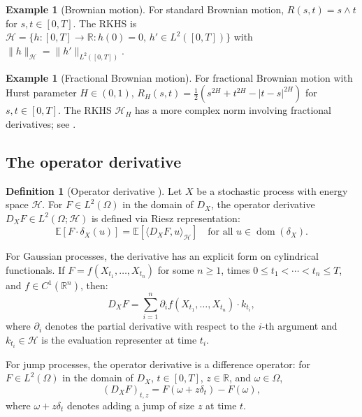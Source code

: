 \documentclass[12pt]{article}
\theoremstyle{plain}
\theoremstyle{definition}
\newtheorem{definition}[theorem]{Definition}
\newtheorem{example}[theorem]{Example}
\theoremstyle{remark}
\newcommand{\E}{\mathbb{E}}
\newcommand{\R}{\mathbb{R}}
\newcommand{\HH}{\mathcal{H}}
\newcommand{\dom}{\operatorname{dom}}
\begin{document}
\begin{example}[Brownian motion]\label{ex:BM-RKHS}
For standard Brownian motion, $R(s,t) = s \wedge t$ for $s, t \in [0,T]$. The RKHS is $\HH = \{h: [0,T] \to \R : h(0) = 0, \, h' \in L^2([0,T])\}$ with $\|h\|_{\HH} = \|h'\|_{L^2([0,T])}$.
\end{example}

\begin{example}[Fractional Brownian motion]\label{ex:fBM-RKHS}
For fractional Brownian motion with Hurst parameter $H \in (0,1)$, $R_H(s,t) = \frac{1}{2}(s^{2H} + t^{2H} - |t-s|^{2H})$ for $s, t \in [0,T]$. The RKHS $\HH_H$ has a more complex norm involving fractional derivatives; see \cite{PipirasTaqqu2017, DecrUstunel1999}.
\end{example}

\subsection{The operator derivative}

\begin{definition}[Operator derivative {\cite{Fontes2026d}}]\label{def:operator-derivative}
Let $X$ be a stochastic process with energy space $\HH$. For $F \in L^2(\Omega)$ in the domain of $D_X$, the operator derivative $D_X F \in L^2(\Omega; \HH)$ is defined via Riesz representation:
\begin{equation}\label{eq:operator-derivative-def}
\E[F \cdot \delta_X(u)] = \E[\langle D_X F, u \rangle_{\HH}] \quad \text{for all } u \in \dom(\delta_X).
\end{equation}
\end{definition}

For Gaussian processes, the derivative has an explicit form on cylindrical functionals. If $F = f(X_{t_1}, \ldots, X_{t_n})$ for some $n \geq 1$, times $0 \leq t_1 < \cdots < t_n \leq T$, and $f \in C^1(\R^n)$, then:
\begin{equation}\label{eq:cylindrical-derivative}
D_X F = \sum_{i=1}^n \partial_i f(X_{t_1}, \ldots, X_{t_n}) \cdot k_{t_i},
\end{equation}
where $\partial_i$ denotes the partial derivative with respect to the $i$-th argument and $k_{t_i} \in \HH$ is the evaluation representer at time $t_i$.

For jump processes, the operator derivative is a difference operator: for $F \in L^2(\Omega)$ in the domain of $D_X$, $t \in [0,T]$, $z \in \R$, and $\omega \in \Omega$,
\begin{equation}\label{eq:jump-derivative}
(D_X F)_{t,z} = F(\omega + z\delta_t) - F(\omega),
\end{equation}
where $\omega + z\delta_t$ denotes adding a jump of size $z$ at time $t$.
\end{document}

